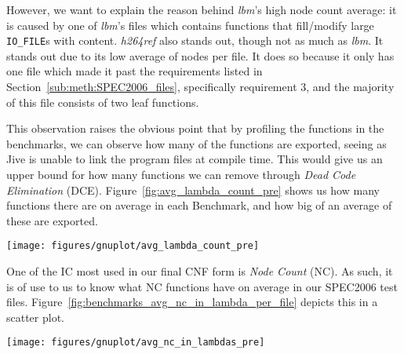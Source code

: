 However, we want to explain the reason behind \textit{lbm}'s high node count
average: it is caused by one of \textit{lbm}'s files which contains functions
that fill/modify large \lstinline!IO_FILE!s with content. \textit{h264ref} also
stands out, though not as much as \textit{lbm}. It stands out due to its low
average of nodes per file. It does so because it only has one file which made it
past the requirements listed in Section~\ref{sub:meth:SPEC2006_files},
specifically requirement 3, and the majority of this file consists of two leaf
functions.

This observation raises the obvious point that by profiling the functions in the
benchmarks, we can observe how many of the functions are exported, seeing as
Jive is unable to link the program files at compile time. This would give us an
upper bound for how many functions we can remove through \textit{Dead Code
Elimination} (DCE). Figure~\ref{fig:avg_lambda_count_pre} shows us how many functions
there are on average in each Benchmark, and how big of an average of these are
exported.

\begin{centering}
	\noindent\begin{minipage}{\textwidth}
		\captionsetup{type=figure}
		\hspace{-1em}
		\texttt{[image: figures/gnuplot/avg\_lambda\_count\_pre]}
	\end{minipage}
	\label{fig:avg_lambda_count_pre}
\end{centering}

One of the IC most used in our final CNF form is \textit{Node Count} (NC). As
such, it is of use to us to know what NC functions have on average in our
SPEC2006 test files. Figure~\ref{fig:benchmarks_avg_nc_in_lambda_per_file}
depicts this in a scatter plot.

\begin{centering}
	\noindent\begin{minipage}{\textwidth}
		\captionsetup{type=figure}
		\hspace{-1em}
		\texttt{[image: figures/gnuplot/avg\_nc\_in\_lambdas\_pre]}
	\end{minipage}
	\label{fig:benchmarks_avg_nc_in_lambda_per_file}
\end{centering}

